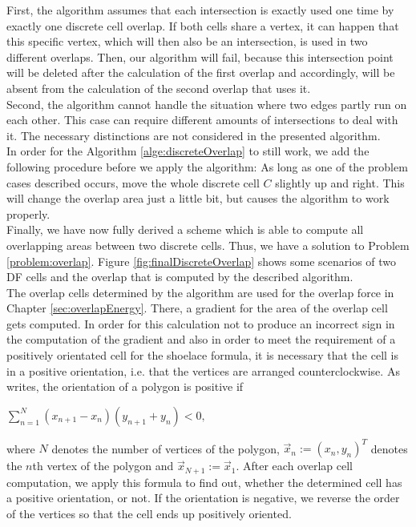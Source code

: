 \documentclass[a4paper,12pt,leqno]{article}
\theoremstyle{plain}
\theoremstyle{remark}
\begin{document}
First, the algorithm assumes that each intersection is exactly used one time by exactly one discrete cell overlap. If both cells share a vertex, it can happen that this specific vertex, which will then also be an intersection, is used in two different overlaps. Then, our algorithm will fail, because this intersection point will be deleted after the calculation of the first overlap and accordingly, will be absent from the calculation of the second overlap that uses it. \\
Second, the algorithm cannot handle the situation where two edges partly run on each other. This case can require different amounts of intersections to deal with it. The necessary distinctions are not considered in the presented algorithm. \\
In order for the Algorithm \ref{alge:discreteOverlap} to still work, we add the following procedure before we apply the algorithm: As long as one of the problem cases described occurs, move the whole discrete cell $C$ slightly up and right. This will change the overlap area just a little bit, but causes the algorithm to work properly. \\
Finally, we have now fully derived a scheme which is able to compute all overlapping areas between two discrete cells. Thus, we have a solution to Problem \ref{problem:overlap}. Figure \ref{fig:finalDiscreteOverlap} shows some scenarios of two DF cells and the overlap that is computed by the described algorithm. \\
The overlap cells determined by the algorithm are used for the overlap force in Chapter \ref{sec:overlapEnergy}. 
There, a gradient for the area of the overlap cell gets computed. In order for this calculation not to produce an incorrect sign in the computation of the gradient and also in order to meet the requirement of a positively orientated cell for the shoelace formula, it is necessary that the cell is in a positive orientation, i.e. that the vertices are arranged counterclockwise. As \cite{Bonvallet2009} writes, the orientation of a polygon is positive if 
\begin{center}
	$
	\sum\limits_{n=1}^{N} (x_{n+1}-x_n)(y_{n+1}+y_n) < 0,
	$
\end{center}
where $N$ denotes the number of vertices of the polygon, $\vec{x}_n := (x_n, y_n)^T$ denotes the $n$th vertex of the polygon and $\vec{x}_{N+1} := \vec{x}_1$. After each overlap cell computation, we apply this formula to find out, whether the determined cell has a positive orientation, or not. If the orientation is negative, we reverse the order of the vertices so that the cell ends up positively oriented. \\
\end{document}

